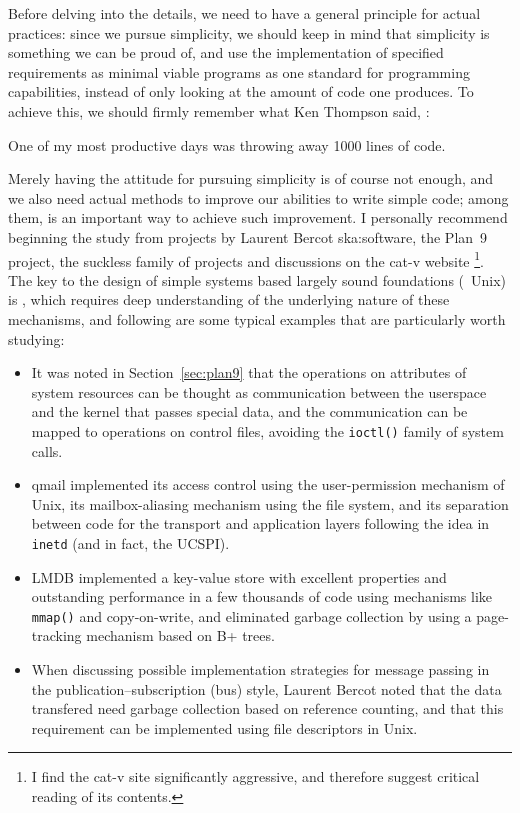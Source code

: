 Before delving into the details, we need to have a general principle for
actual practices: since we pursue simplicity, we should keep in mind that
simplicity is something we can be proud of, and use the implementation of
specified requirements as minimal viable programs
as one standard for programming capabilities, instead of only looking
at the amount of code one produces.  To achieve this, we should firmly
remember what Ken Thompson said, :
\begin{quoting}
	One of my most productive days was throwing away 1000 lines of code.
\end{quoting}
Merely having the attitude for pursuing simplicity is of course not enough,
and we also need actual methods to improve our abilities to write simple code;
among them,  is an important way to achieve such improvement.  I personally
recommend beginning the study from projects by Laurent Bercot\cupercite%
{ska:software}, the Plan~9 project, the suckless family
of projects and discussions on the cat-v website%
\footnote{I find the cat-v site significantly aggressive,
and therefore suggest critical reading of its contents.}.  The key to
the design of simple systems based largely sound foundations (\eg~Unix)
is , which requires deep
understanding of the underlying nature of these mechanisms, and following
are some typical examples that are particularly worth studying:
\begin{itemize}
\item It was noted in Section~\ref{sec:plan9} that the operations on
	attributes of system resources can be thought as communication
	between the userspace and the kernel that passes special data,
	and the communication can be mapped to operations on control
	files, avoiding the \verb|ioctl()| family of system calls.
\item qmail implemented its access control
	using the user-permission mechanism of Unix, its mailbox-aliasing
	mechanism using the file system, and its separation between code
	for the transport and application layers following the idea in
	\verb|inetd| (and in fact, the UCSPI).
\item LMDB implemented a key-value store with excellent
	properties and outstanding performance in a few thousands of code using
	mechanisms like \verb|mmap()| and copy-on-write, and eliminated garbage
	collection by using a page-tracking mechanism based on B+ trees.
\item When discussing possible implementation strategies for message
	passing in the publication--subscription (bus) style, Laurent Bercot
	noted that the data transfered need garbage
	collection based on reference counting, and that this requirement
	can be implemented using file descriptors in Unix.
\end{itemize}

